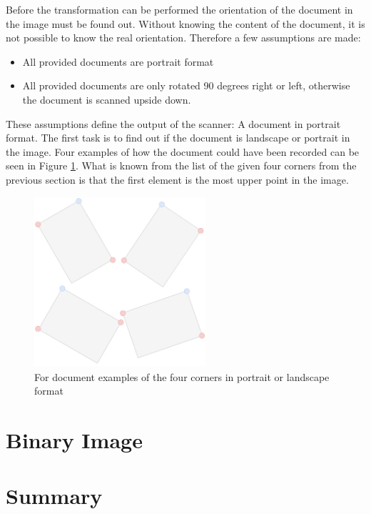 \documentclass[twocolumn,10pt]{asme2ej}
\begin{document}
Before the transformation can be performed the orientation of the document in the image must be found out.
Without knowing the content of the document, it is not possible to know the real orientation. Therefore a few assumptions are made:
\begin{itemize}
    \item All provided documents are portrait format
    \item All provided documents are only rotated 90 degrees right or left, otherwise the document is scanned upside down.
\end{itemize}
These assumptions define the output of the scanner: A document in portrait format.
The first task is to find out if the document is landscape or portrait in the image.
Four examples of how the document could have been recorded can be seen in Figure \ref{fig:fourcorners}.
What is known from the list of the given four corners from the previous section is that the first element is the most upper point in the image. 

\begin{figure}[H]
\centerline{\includegraphics[width=2.5in]{output/a.png}}
\caption{For document examples of the four corners in portrait or landscape format}
\label{fig:fourcorners}
\end{figure}





\section{Binary Image}


\section{Summary}
\end{document}
